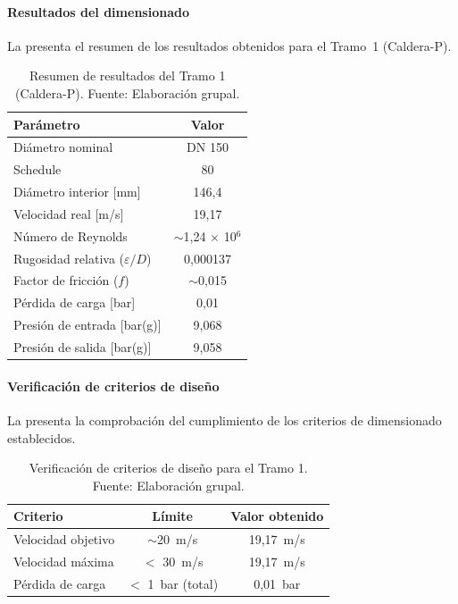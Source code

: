 \documentclass[12pt]{article}
\begin{document}
\paragraph{Resultados del dimensionado}

La  presenta el resumen de los resultados obtenidos para el Tramo~1 (Caldera-P).

\begin{table}[H]
	\centering
	\caption{Resumen de resultados del Tramo 1 (Caldera-P). Fuente: Elaboración grupal.}
	\label{tab:resultados-tramo1}
	\begin{tabular}{lc}
		\toprule
		\textbf{Parámetro}                   & \textbf{Valor}             \\
		\midrule
		Diámetro nominal                     & DN 150                     \\
		Schedule                             & 80                         \\
		Diámetro interior [mm]               & 146,4                      \\
		Velocidad real [m/s]                 & 19,17                      \\
		Número de Reynolds                   & $\sim$1,24 $\times$ 10$^6$ \\
		Rugosidad relativa ($\varepsilon/D$) & 0,000137                   \\
		Factor de fricción ($f$)             & $\sim$0,015                \\
		Pérdida de carga [bar]               & 0,01                       \\
		Presión de entrada [bar(g)]          & 9,068                      \\
		Presión de salida [bar(g)]           & 9,058                      \\
		\bottomrule
	\end{tabular}
\end{table}

\paragraph{Verificación de criterios de diseño}

La  presenta la comprobación del cumplimiento de los criterios de dimensionado establecidos.

\begin{table}[H]
	\centering
	\caption{Verificación de criterios de diseño para el Tramo 1. Fuente: Elaboración grupal.}
	\label{tab:verificacion-criterios-tramo1}
	\begin{tabular}{lcc}
		\toprule
		\textbf{Criterio}  & \textbf{Límite}   & \textbf{Valor obtenido} \\
		\midrule
		Velocidad objetivo & $\sim$20~m/s      & 19,17~m/s               \\
		Velocidad máxima   & $<$ 30~m/s        & 19,17~m/s               \\
		Pérdida de carga   & $<$ 1~bar (total) & 0,01~bar                \\
		\bottomrule
	\end{tabular}
\end{table}
\end{document}
